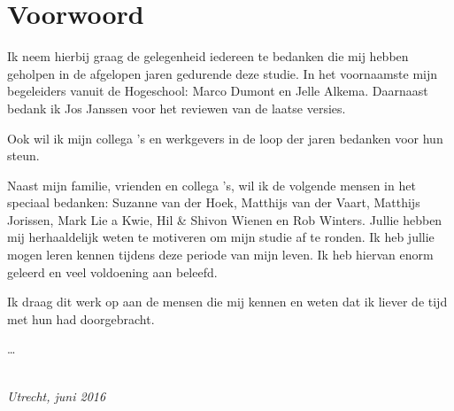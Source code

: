 \chapter*{Voorwoord}

Ik neem hierbij graag de gelegenheid iedereen te bedanken die mij hebben geholpen in de afgelopen jaren gedurende deze studie. In het voornaamste mijn begeleiders vanuit de Hogeschool: Marco Dumont en Jelle Alkema.\newline
Daarnaast bedank ik Jos Janssen voor het reviewen van de laatse versies.\newline

Ook wil ik mijn collega 's en werkgevers in de loop der jaren bedanken voor hun steun.\newline

Naast mijn familie, vrienden en collega 's, wil ik de volgende mensen in het speciaal bedanken: \newline
Suzanne van der Hoek, Matthijs van der Vaart, Matthijs Jorissen, Mark Lie a Kwie, Hil \& Shivon Wienen en Rob Winters.\newline
Jullie hebben mij herhaaldelijk weten te motiveren om mijn studie af te ronden. Ik heb jullie mogen leren kennen tijdens deze periode van mijn leven. Ik heb hiervan enorm geleerd en veel voldoening aan beleefd.\newline 

Ik draag dit werk op aan de mensen die mij kennen en weten dat ik liever de tijd met hun had doorgebracht.

\ldots

\begin{flushright}
{\makeatletter\itshape
    \@author \\
    Utrecht, juni 2016
\makeatother}
\end{flushright}

